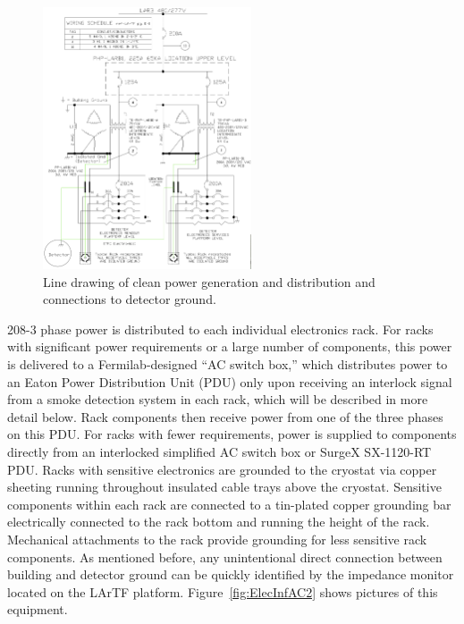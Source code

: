 \begin{figure}[htb!pb]
\centering
\includegraphics[width=0.55\textwidth]{./figures/PowerDiagPic1.png}
\caption[]{Line drawing of clean power generation and distribution and connections to detector ground.}
\label{fig:ElecInfAC1}
\end{figure}






208-3 phase power is distributed to each individual electronics rack.  For racks with significant power requirements or a large number of components, this power is delivered to a Fermilab-designed ``AC switch box,'' which distributes power to an Eaton Power Distribution Unit (PDU) only upon receiving an interlock signal from a smoke detection system in each rack, which will be described in more detail below.  Rack components then receive power from one of the three phases on this PDU.  For racks with fewer requirements, power is supplied to components directly from an interlocked simplified AC switch box or SurgeX SX-1120-RT PDU.  Racks with sensitive electronics are grounded to the cryostat via copper sheeting running throughout insulated cable trays above the cryostat.  Sensitive components within each rack are connected to a tin-plated copper grounding bar electrically connected to the rack bottom and running the height of the rack.  Mechanical attachments to the rack provide grounding for less sensitive rack components.  As mentioned before, any unintentional direct connection between building and detector ground can be quickly identified by the impedance monitor located on the LArTF platform.  Figure~\ref{fig:ElecInfAC2} shows pictures of this equipment.

